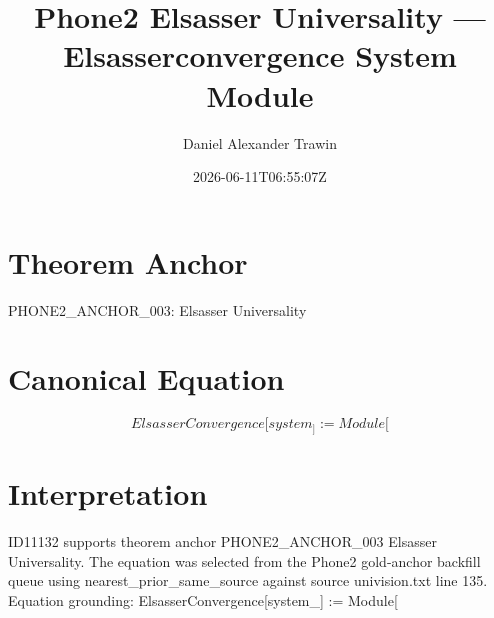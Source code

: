 \documentclass[11pt]{article}
\title{Phone2 Elsasser Universality — Elsasserconvergence System Module}
\author{Daniel Alexander Trawin}
\date{2026-06-11T06:55:07Z}
\begin{document}
\maketitle
\section*{Theorem Anchor}
PHONE2_ANCHOR_003: Elsasser Universality
\section*{Canonical Equation}
\[
ElsasserConvergence[system_] := Module[
\]
\section*{Interpretation}
ID11132 supports theorem anchor PHONE2_ANCHOR_003 Elsasser Universality. The equation was selected from the Phone2 gold-anchor backfill queue using nearest_prior_same_source against source univision.txt line 135. Equation grounding: ElsasserConvergence[system_] := Module[
\end{document}
